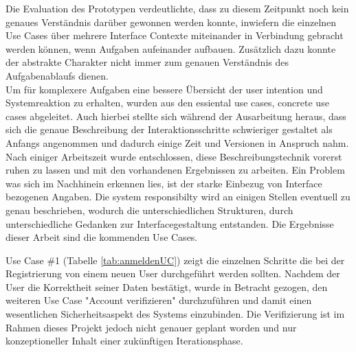 Die Evaluation des Prototypen verdeutlichte, dass zu diesem Zeitpunkt noch kein genaues Verständnis darüber gewonnen werden konnte, inwiefern die einzelnen Use Cases über mehrere Interface Contexte miteinander in Verbindung gebracht werden können, wenn Aufgaben aufeinander aufbauen. Zusätzlich dazu konnte der abstrakte Charakter nicht immer zum genauen Verständnis des Aufgabenablaufs dienen.\\
Um für komplexere Aufgaben eine bessere Übersicht der user intention und Systemreaktion zu erhalten, wurden aus den essiental use cases, concrete use cases abgeleitet. Auch hierbei stellte sich während der Ausarbeitung heraus, dass sich die genaue Beschreibung der Interaktionsschritte schwieriger gestaltet als Anfangs angenommen und dadurch einige Zeit und Versionen in Anspruch nahm. Nach einiger Arbeitszeit wurde entschlossen, diese Beschreibungstechnik vorerst ruhen zu lassen und mit den vorhandenen Ergebnissen zu arbeiten. Ein Problem was sich im Nachhinein erkennen lies, ist der starke Einbezug von Interface bezogenen Angaben. Die system responsibilty wird an einigen Stellen eventuell zu genau beschrieben, wodurch die unterschiedlichen Strukturen, durch unterschiedliche Gedanken zur Interfacegestaltung entstanden. Die Ergebnisse dieser Arbeit sind die kommenden Use Cases.



\newpage
Use Case \#1 (Tabelle \ref{tab:anmeldenUC}) zeigt die einzelnen Schritte die bei der Registrierung von einem neuen User durchgeführt werden sollten.
Nachdem der User die Korrektheit seiner Daten bestätigt, wurde in Betracht gezogen, den weiteren Use Case "Account verifizieren" durchzuführen und damit einen wesentlichen Sicherheitsaspekt des Systems einzubinden. Die Verifizierung ist im Rahmen dieses Projekt jedoch nicht genauer geplant worden und nur konzeptioneller Inhalt einer zukünftigen Iterationsphase.

